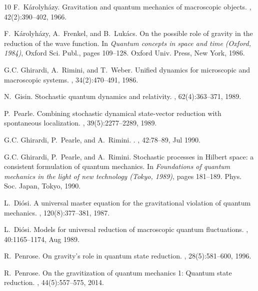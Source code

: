 \documentclass[reqno,11pt]{amsart}
\numberwithin{equation}{section}
\newcommand{\1}{\mathds{1}}
\begin{document}
{{{\begin{thebibliography}{10}
F.~K\'arolyh\'azy.
\newblock Gravitation and quantum mechanics of macroscopic objects.
, 42(2):390--402, 1966.

F.~K\'arolyh\'azy, A.~Frenkel, and B.~Luk\'acs.
\newblock On the possible role of gravity in the reduction of the wave
  function.
\newblock In {\em Quantum concepts in space and time ({O}xford, 1984)}, Oxford
  Sci. Publ., pages 109--128. Oxford Univ. Press, New York, 1986.

G.C. Ghirardi, A.~Rimini, and T.~Weber.
\newblock Unified dynamics for microscopic and macroscopic systems.
, 34(2):470--491, 1986.

N.~Gisin.
\newblock Stochastic quantum dynamics and relativity.
, 62(4):363--371, 1989.

P.~Pearle.
\newblock Combining stochastic dynamical state-vector reduction with
  spontaneous localization.
, 39(5):2277--2289, 1989.

G.C. Ghirardi, P.~Pearle, and A.~Rimini.
.
, 42:78--89, Jul 1990.

G.C. Ghirardi, P.~Pearle, and A.~Rimini.
\newblock Stochastic processes in {H}ilbert space: a consistent formulation of
  quantum mechanics.
\newblock In {\em Foundations of quantum mechanics in the light of new
  technology ({T}okyo, 1989)}, pages 181--189. Phys. Soc. Japan, Tokyo, 1990.

L.~Di\'osi.
\newblock A universal master equation for the gravitational violation of
  quantum mechanics.
, 120(8):377--381, 1987.

L.~Di\'osi.
\newblock Models for universal reduction of macroscopic quantum fluctuations.
, 40:1165--1174, Aug 1989.

R.~Penrose.
\newblock On gravity's role in quantum state reduction.
, 28(5):581--600, 1996.

R.~Penrose.
\newblock On the gravitization of quantum mechanics 1: {Q}uantum state
  reduction.
, 44(5):557--575, 2014.


\end{thebibliography}}}}
\end{document}
